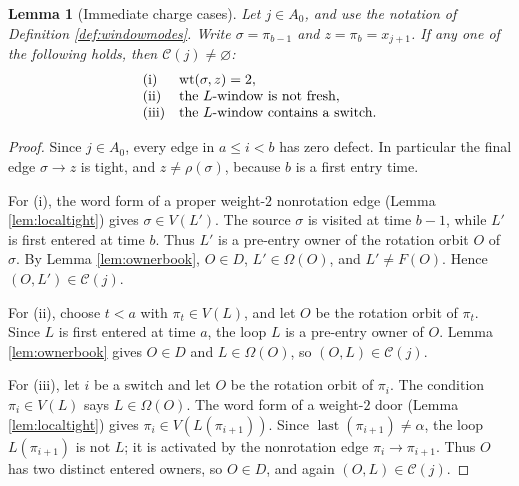 \documentclass[11pt]{article}
\newtheorem{lemma}[theorem]{Lemma}
\DeclareMathOperator{\wt}{wt}
\begin{document}
\begin{lemma}[Immediate charge cases]\label{lem:immediate}
Let \(j\in A_0\), and use the notation of Definition \ref{def:windowmodes}.  Write
\(\sigma=\pi_{b-1}\) and \(z=\pi_b=x_{j+1}\).  If any one of the following holds, then
\(\mathcal C(j)\ne\varnothing\):
\[
\begin{array}{ll}
\text{\rm (i)} & \wt(\sigma,z)=2,\\
\text{\rm (ii)}& \text{the \(L\)-window is not fresh},\\
\text{\rm (iii)}& \text{the \(L\)-window contains a switch}.
\end{array}
\]
\end{lemma}

\begin{proof}
Since \(j\in A_0\), every edge in \(a\le i<b\) has zero defect.  In particular the final edge
\(\sigma\to z\) is tight, and \(z\ne\rho(\sigma)\), because \(b\) is a first entry time.

For (i), the word form of a proper weight-\(2\) nonrotation edge (Lemma \ref{lem:localtight}) gives
\(\sigma\in V(L')\).  The source \(\sigma\) is visited at time \(b-1\), while \(L'\) is first
entered at time \(b\).  Thus \(L'\) is a pre-entry owner of the rotation orbit \(O\) of
\(\sigma\).  By Lemma \ref{lem:ownerbook}, \(O\in D\), \(L'\in\Omega(O)\), and \(L'\ne F(O)\).
Hence \((O,L')\in\mathcal C(j)\).

For (ii), choose \(t<a\) with \(\pi_t\in V(L)\), and let \(O\) be the rotation orbit of
\(\pi_t\).  Since \(L\) is first entered at time \(a\), the loop \(L\) is a pre-entry owner of
\(O\).  Lemma \ref{lem:ownerbook} gives \(O\in D\) and \(L\in\Omega(O)\), so
\((O,L)\in\mathcal C(j)\).

For (iii), let \(i\) be a switch and let \(O\) be the rotation orbit of \(\pi_i\).  The condition
\(\pi_i\in V(L)\) says \(L\in\Omega(O)\).  The word form of a weight-\(2\) door (Lemma \ref{lem:localtight}) gives
\(\pi_i\in V(L(\pi_{i+1}))\).  Since \(\operatorname{last}(\pi_{i+1})\ne \alpha\), the loop
\(L(\pi_{i+1})\) is not \(L\); it is activated by the nonrotation edge \(\pi_i\to\pi_{i+1}\).  Thus
\(O\) has two distinct entered owners, so \(O\in D\), and again \((O,L)\in\mathcal C(j)\).
\end{proof}
\end{document}
